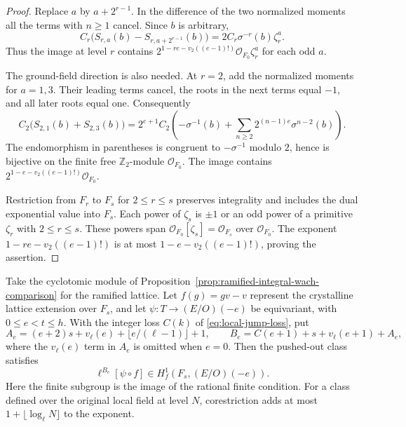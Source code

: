 \begin{proof}
Replace \(a\) by \(a+2^{r-1}\). In the difference of the two normalized moments all the terms with \(n\ge1\) cancel. Since \(b\) is arbitrary,
\[
 C_r\bigl(S_{r,a}(b)-S_{r,a+2^{r-1}}(b)\bigr)
                   =2 C_r\sigma^{-r}(b)\zeta_r^a .
\]
Thus the image at level \(r\) contains \(2^{1-re-v_2((e-1)!)}\mathcal O_{F_0}\zeta_r^a\) for each odd \(a\).

The ground-field direction is also needed. At \(r=2\), add the normalized moments for \(a=1,3\). Their leading terms cancel, the roots in the next terms equal \(-1\), and all later roots equal one. Consequently
\[
 C_2\bigl(S_{2,1}(b)+S_{2,3}(b)\bigr)
 =2^{e+1}C_2\left(-\sigma^{-1}(b)+
             \sum_{n\ge2}2^{(n-1)e}\sigma^{n-2}(b)\right).
\]
The endomorphism in parentheses is congruent to \(-\sigma^{-1}\) modulo \(2\), hence is bijective on the finite free \(\mathbb Z_2\)-module \(\mathcal O_{F_0}\). The image contains \(2^{1-e-v_2((e-1)!)}\mathcal O_{F_0}\).

Restriction from \(F_r\) to \(F_s\) for \(2\le r\le s\) preserves integrality and includes the dual exponential value into \(F_s\). Each power of \(\zeta_s\) is \(\pm1\) or an odd power of a primitive \(\zeta_r\) with \(2\le r\le s\). These powers span \(\mathcal O_{F_0}[\zeta_s]=\mathcal O_{F_s}\) over \(\mathcal O_{F_0}\). The exponent \(1-re-v_2((e-1)!)\) is at most \(1-e-v_2((e-1)!)\), proving the assertion.
\end{proof}

\begin{proposition}\label{prop:cyclotomic-scalar-finite-condition}
Take the cyclotomic module of Proposition~\ref{prop:ramified-integral-wach-comparison} for the ramified lattice. Let \(f(g)=gv-v\) represent the crystalline lattice extension over \(F_s\),
and let \(\psi:T\to(E/O)(-e)\) be equivariant, with \(0\le e<t\le h\).
With the integer loss \(C(k)\) of \eqref{eq:local-jump-loss}, put
\[
 A_e=(e+2)s+v_\ell(e)+\lfloor e/(\ell-1)\rfloor+1,
 \qquad B_e=C(e+1)+s+v_\ell(e+1)+A_e,
\]
where the \(v_\ell(e)\) term in \(A_e\) is omitted when \(e=0\). Then the pushed-out class satisfies
\[
 \ell^{B_e}[\psi\circ f]\in H^1_f(F_s,(E/O)(-e)).
\]
Here the finite subgroup is the image of the rational finite condition.
For a class defined over the original local field at level \(N\),
corestriction adds at most \(1+\lfloor\log_\ell N\rfloor\) to the exponent.
\end{proposition}

